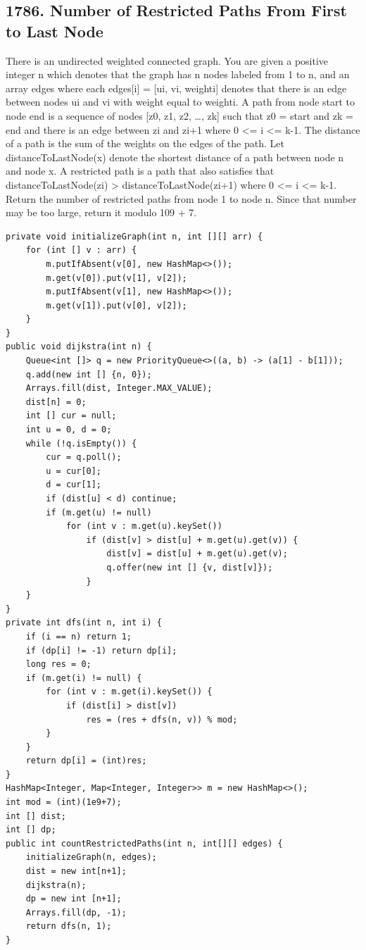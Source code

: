 \documentclass[9pt, b5paper]{article}
\begin{document}
\subsection{1786. Number of Restricted Paths From First to Last Node}
\label{sec-4-7}
There is an undirected weighted connected graph. You are given a positive integer n which denotes that the graph has n nodes labeled from 1 to n, and an array edges where each edges[i] = [ui, vi, weighti] denotes that there is an edge between nodes ui and vi with weight equal to weighti.
A path from node start to node end is a sequence of nodes [z0, z1, z2, \ldots{}, zk] such that z0 = start and zk = end and there is an edge between zi and zi+1 where 0 <= i <= k-1.
The distance of a path is the sum of the weights on the edges of the path. Let distanceToLastNode(x) denote the shortest distance of a path between node n and node x. A restricted path is a path that also satisfies that distanceToLastNode(zi) > distanceToLastNode(zi+1) where 0 <= i <= k-1.
Return the number of restricted paths from node 1 to node n. Since that number may be too large, return it modulo 109 + 7.
\begin{verbatim}
private void initializeGraph(int n, int [][] arr) {
    for (int [] v : arr) {
        m.putIfAbsent(v[0], new HashMap<>());
        m.get(v[0]).put(v[1], v[2]);
        m.putIfAbsent(v[1], new HashMap<>());
        m.get(v[1]).put(v[0], v[2]);
    }
}
public void dijkstra(int n) {
    Queue<int []> q = new PriorityQueue<>((a, b) -> (a[1] - b[1]));
    q.add(new int [] {n, 0});
    Arrays.fill(dist, Integer.MAX_VALUE);
    dist[n] = 0;
    int [] cur = null;
    int u = 0, d = 0;
    while (!q.isEmpty()) {
        cur = q.poll();
        u = cur[0];
        d = cur[1];
        if (dist[u] < d) continue;
        if (m.get(u) != null) 
            for (int v : m.get(u).keySet()) 
                if (dist[v] > dist[u] + m.get(u).get(v)) {
                    dist[v] = dist[u] + m.get(u).get(v);
                    q.offer(new int [] {v, dist[v]});
                }
    }
}
private int dfs(int n, int i) { 
    if (i == n) return 1;
    if (dp[i] != -1) return dp[i];
    long res = 0;
    if (m.get(i) != null) {
        for (int v : m.get(i).keySet()) {
            if (dist[i] > dist[v])
                res = (res + dfs(n, v)) % mod;
        }
    }
    return dp[i] = (int)res;
}
HashMap<Integer, Map<Integer, Integer>> m = new HashMap<>();
int mod = (int)(1e9+7);
int [] dist;
int [] dp;
public int countRestrictedPaths(int n, int[][] edges) {
    initializeGraph(n, edges);
    dist = new int[n+1];
    dijkstra(n);
    dp = new int [n+1];
    Arrays.fill(dp, -1);
    return dfs(n, 1);
}
\end{verbatim}
\end{document}
